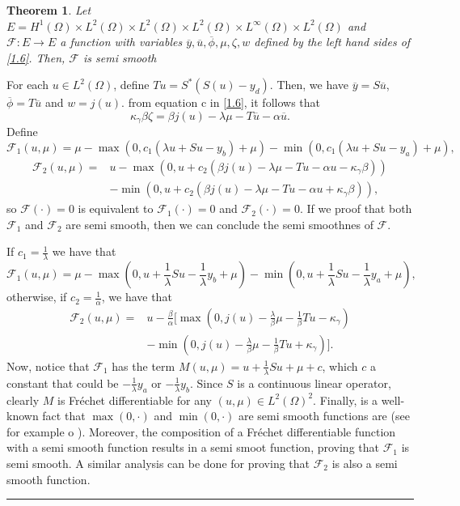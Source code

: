 \documentclass[11pt,a4paper]{amsart}
\newcommand{\kw}{\rule{2mm}{2mm}}
\renewcommand{\l}{\left}
\renewcommand{\r}{\right}
\newcommand{\om}{\Omega}
\renewenvironment{proof}{{Proof.}}{\hfill\kw}
\newtheorem{theorem}{{Theorem}}
\begin{document}
\begin{theorem}
\normalfont
    Let $E=H^1(\om)\times L^{2}(\om)\times L^{2}(\om)\times L^{2}(\om)\times L^{\infty}(\om)\times L^{2}(\om)$ and $\mathcal{F}: E\to E$ a function with variables $\overline{y},\overline{u},\overline{\phi},\mu,\zeta,w$ defined by the left hand sides of \eqref{1.6}. Then, $\mathcal{F}$ is semi smooth
\end{theorem}
\begin{proof}
For each $u \in L^2(\om)$, define $Tu=S^*(S(u)-y_d)$. Then, we have $\overline{y}=S\overline{u}$, $\overline{\phi}=T\overline{u}$ and $w=j(u)$. from equation c in \eqref{1.6}, it follows that
\[
    \kappa_{\gamma}\beta\zeta=\beta j(u)-\lambda \mu-T\overline{u}-\alpha\overline{u}.
\]
Define 
\[
    \mathcal{F}_1(u,\mu)=\mu-\max(0,c_1(\lambda u+Su-y_b)+\mu)-\min(0,c_1(\lambda u+Su-y_a)+\mu),
\]
\begin{align*}
    \mathcal{F}_2(u,\mu)=&u-\max(0,u+c_2(\beta j(u)-\lambda\mu-Tu-\alpha u-\kappa_{\gamma}\beta))\\
    &-\min(0,u+c_2(\beta j(u)-\lambda\mu-Tu-\alpha u+\kappa_{\gamma}\beta)),
\end{align*}
so $\mathcal{F}(\cdot)=0$ is equivalent to $\mathcal{F}_1(\cdot)=0$ and $\mathcal{F}_2(\cdot)=0$. If we proof that both $\mathcal{F}_1$ and $   \mathcal{F}_2$ are semi smooth, then we can conclude the semi smoothnes of $\mathcal{F}$.


If $c_1=\frac{1}{\lambda}$ we have that
\[
    \mathcal{F}_1(u,\mu)=\mu-\max\l(0,u+\frac{1}{\lambda}Su-\frac{1}{\lambda} y_b+\mu\r)-\min\l(0,u+\frac{1}{\lambda}Su-\frac{1}{\lambda}y_a+\mu\r),
\]
otherwise, if  $c_2=\frac{1}{\alpha}$, we have that
\begin{align*}
    \mathcal{F}_2(u,\mu)=&u-\frac{\beta}{\alpha}\bigg[\max\l(0,j(u)-\frac{\lambda }{\beta}\mu-\frac{1}{\beta}Tu-\kappa_{\gamma}\r)\\
    &-\min\l(0,j(u)-\frac{\lambda }{\beta}\mu-\frac{1}{\beta}Tu+\kappa_{\gamma}\r)\bigg].
\end{align*}
Now, notice that $\mathcal{F}_1$ has the term $M(u,\mu)=u+\frac{1}{\lambda}Su+\mu+c$, which $c$ a constant that could be $-\frac{1}{\lambda}y_a$ or $-\frac{1}{\lambda}y_b$. Since $S$ is a continuous linear operator, clearly $M$ is Fréchet differentiable for any $(u,\mu)\in L^2(\om)^2$. Finally, is a well-known fact that $\max(0,\cdot)$ and $\min(0,\cdot)$ are semi smooth functions are (see for example \cite{delosreyes} o \cite{ito-kunish}). Moreover, the composition of a Fréchet differentiable function with a semi smooth function results in a semi smoot function, proving that $\mathcal{F}_1$ is semi smooth. A similar analysis can be done for proving that $\mathcal{F}_2$ is also a semi smooth function. 
\end{proof}\\
\end{document}
